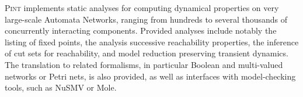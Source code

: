 \textsc{Pint} implements static analyses for computing dynamical properties on very large-scale Automata Networks, ranging from hundreds to several thousands of concurrently interacting components. Provided analyses include notably the listing of fixed points, the analysis successive reachability properties, the inference of cut sets for reachability, and model reduction preserving transient dynamics. The translation to related formalisms, in particular Boolean and multi-valued networks or Petri nets, is also provided, as well as interfaces with model-checking tools, such as NuSMV or Mole.